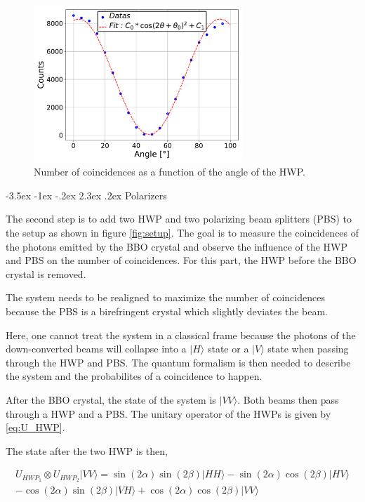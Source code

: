 \documentclass[a4paper, 12pt,oneside]{article}
\makeatletter
\renewcommand{\subsection}{\@startsection {subsection}{1}{\z@}%
             {-3.5ex \@plus -1ex \@minus -.2ex}%
             {2.3ex \@plus.2ex}%
             {\normalfont\normalsize\bfseries}}
\makeatother
\begin{document}
\begin{figure}[H]
    \centering
    \includegraphics[width=0.7\textwidth]{Figures/Malus_HWP1.pdf}
    \caption{Number of coincidences as a function of the angle of the HWP.}
    \label{fig:Malus1}
\end{figure}

\subsection{Polarizers}

The second step is to add two HWP and two polarizing beam splitters (PBS) to the setup as shown in figure \ref{fig:setup}. The goal is to measure the coincidences of the photons emitted by the BBO crystal and observe the influence of the HWP and PBS on the number of coincidences. For this part, the HWP before the BBO crystal is removed.

The system needs to be realigned to maximize the number of coincidences because the PBS is a birefringent crystal which slightly deviates the beam.

Here, one cannot treat the system in a classical frame because the photons of the down-converted beams will collapse into a $|H\rangle$ state or a $|V\rangle$ state when passing through the HWP and PBS. The quantum formalism is then needed to describe the system and the probabilites of a coincidence to happen. 

After the BBO crystal, the state of the system is $|VV\rangle$. Both beams then pass through a HWP and a PBS. The unitary operator of the HWPs is given by \eqref{eq:U_HWP}.

The state after the two HWP is then,

\begin{align*}
    U_{HWP_1} \otimes U_{HWP_2} |VV\rangle = \sin(2\alpha) \sin(2\beta) |HH\rangle - \sin(2\alpha) \cos(2\beta) |HV\rangle \\
    - \cos(2\alpha) \sin(2\beta) |VH\rangle + \cos(2\alpha) \cos(2\beta) |VV\rangle
\end{align*}
\end{document}
